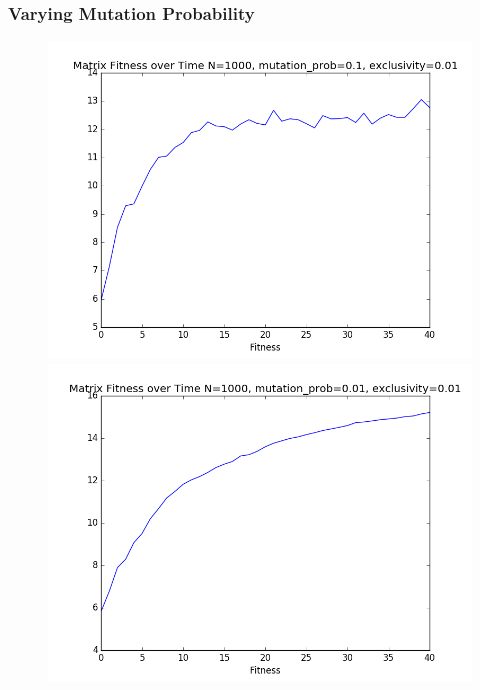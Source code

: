 \documentclass{article}
\begin{document}
\subsubsection{Varying Mutation Probability}

\begin{figure}[H]
\centering
\begin{minipage}{.5\textwidth}
  \centering
  \includegraphics[width=1\linewidth]{../graphs/fitness1.png}
\end{minipage}%
\begin{minipage}{.5\textwidth}
  \centering
  \includegraphics[width=1\linewidth]{../graphs/fitness2.png}
\end{minipage}
\end{figure}
\end{document}
